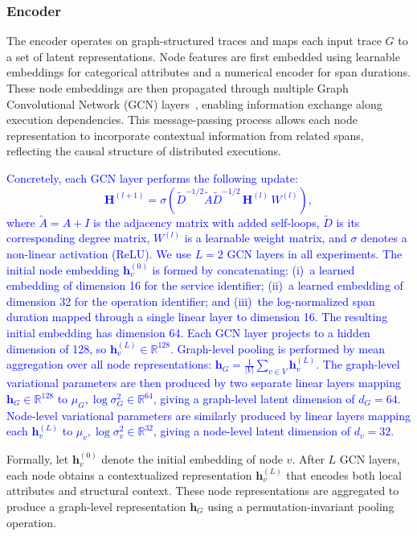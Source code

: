 \documentclass[sigconf,review]{acmart}
\begin{document}
\subsubsection{Encoder}

The encoder operates on graph-structured traces and maps each input trace $G$ to a set of latent representations. Node features are first embedded using learnable embeddings for categorical attributes and a numerical encoder for span durations. These node embeddings are then propagated through multiple Graph Convolutional Network (GCN) layers~\cite{kipf2016semi}, enabling information exchange along execution dependencies. This message-passing process allows each node representation to incorporate contextual information from related spans, reflecting the causal structure of distributed executions.

\textcolor{blue}{Concretely, each GCN layer performs the following update:
\[
\mathbf{H}^{(l+1)} = \sigma\!\left(\tilde{D}^{-1/2}\tilde{A}\tilde{D}^{-1/2}\,\mathbf{H}^{(l)}\,W^{(l)}\right),
\]
where $\tilde{A} = A + I$ is the adjacency matrix with added self-loops, $\tilde{D}$ is its corresponding degree matrix, $W^{(l)}$ is a learnable weight matrix, and $\sigma$ denotes a non-linear activation (ReLU). We use $L = 2$ GCN layers in all experiments. The initial node embedding $\mathbf{h}_v^{(0)}$ is formed by concatenating: (i)~a learned embedding of dimension 16 for the service identifier; (ii)~a learned embedding of dimension 32 for the operation identifier; and (iii)~the log-normalized span duration mapped through a single linear layer to dimension 16. The resulting initial embedding has dimension 64. Each GCN layer projects to a hidden dimension of 128, so $\mathbf{h}_v^{(L)} \in \mathbb{R}^{128}$. Graph-level pooling is performed by mean aggregation over all node representations: $\mathbf{h}_G = \frac{1}{|V|}\sum_{v\in V}\mathbf{h}_v^{(L)}$. The graph-level variational parameters are then produced by two separate linear layers mapping $\mathbf{h}_G \in \mathbb{R}^{128}$ to $\mu_G, \log\sigma_G^2 \in \mathbb{R}^{64}$, giving a graph-level latent dimension of $d_G = 64$. Node-level variational parameters are similarly produced by linear layers mapping each $\mathbf{h}_v^{(L)}$ to $\mu_v, \log\sigma_v^2 \in \mathbb{R}^{32}$, giving a node-level latent dimension of $d_v = 32$.}

Formally, let $\mathbf{h}_v^{(0)}$ denote the initial embedding of node $v$. After $L$ GCN layers, each node obtains a contextualized representation $\mathbf{h}_v^{(L)}$ that encodes both local attributes and structural context. These node representations are aggregated to produce a graph-level representation $\mathbf{h}_G$ using a permutation-invariant pooling operation.
\end{document}
